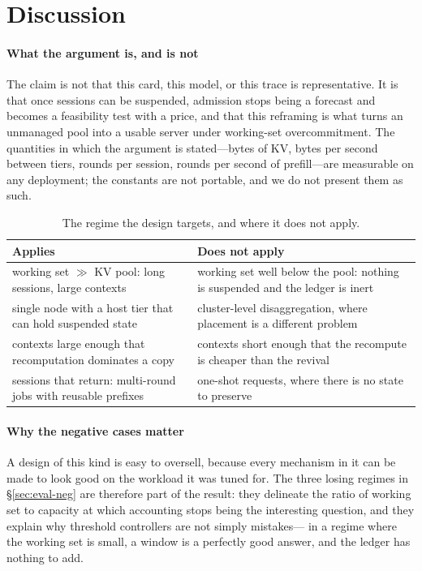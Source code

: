 \section{Discussion}
\label{sec:discussion}

\paragraph{What the argument is, and is not} The claim is not that this card, this model,
or this trace is representative. It is that once sessions can be suspended, admission stops
being a forecast and becomes a feasibility test with a price, and that this reframing is
what turns an unmanaged pool into a usable server under working-set overcommitment. The
quantities in which the argument is stated---bytes of KV, bytes per second between tiers,
rounds per session, rounds per second of prefill---are measurable on any deployment; the
constants are not portable, and we do not present them as such.

\begin{table}[t]
\caption{The regime the design targets, and where it does not apply.}
\label{tab:scope}
\centering
\small
\begin{tabular}{@{}p{}p{}@{}}
\toprule
Applies & Does not apply \\
\midrule
working set $\gg$ KV pool: long sessions, large contexts &
working set well below the pool: nothing is suspended and the ledger is inert \\
single node with a host tier that can hold suspended state &
cluster-level disaggregation, where placement is a different problem \\
contexts large enough that recomputation dominates a copy &
contexts short enough that the recompute is cheaper than the revival \\
sessions that return: multi-round jobs with reusable prefixes &
one-shot requests, where there is no state to preserve \\
\bottomrule
\end{tabular}
\end{table}

\paragraph{Why the negative cases matter} A design of this kind is easy to oversell,
because every mechanism in it can be made to look good on the workload it was tuned for.
The three losing regimes in \S\ref{sec:eval-neg} are therefore part of the result: they
delineate the ratio of working set to capacity at which accounting stops being the
interesting question, and they explain why threshold controllers are not simply mistakes---
in a regime where the working set is small, a window is a perfectly good answer, and the
ledger has nothing to add.

